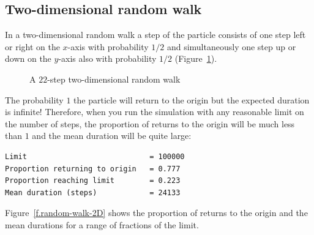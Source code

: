 \documentclass[11pt,a4paper]{article}
\begin{document}
\subsection{Two-dimensional random walk}

In a two-dimensional random walk a step of the particle consists of one step left or right on the $x$-axis with probability $1/2$ and simultaneously one step up or down on the $y$-axis also with probability $1/2$ (Figure~\ref{f.2d-random-walk}).

\begin{figure}
\begin{center}
\end{center}
\caption{A $22$-step two-dimensional random walk}\label{f.2d-random-walk}
\end{figure}
The probability $1$ the particle will return to the origin but the expected duration is infinite! Therefore, when you run the simulation with any reasonable limit on the number of steps, the proportion of returns to the origin will be much less than $1$ and the mean duration will be quite large:
\begin{verbatim}
Limit                            = 100000
Proportion returning to origin   = 0.777
Proportion reaching limit        = 0.223
Mean duration (steps)            = 24133
\end{verbatim}
Figure~\ref{f.random-walk-2D} shows the proportion of returns to the origin and the mean durations for a range of fractions of the limit.
\end{document}
